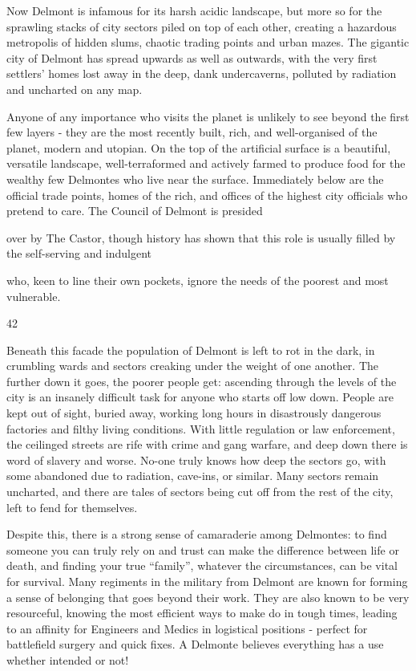 Now Delmont is infamous for its harsh acidic landscape, but more so for the sprawling stacks of city sectors piled on top of each other, creating a hazardous metropolis of hidden slums, chaotic trading points and urban mazes. The gigantic city of Delmont has spread upwards as well as outwards, with the very first settlers' homes lost away in the deep, dank undercaverns, polluted by radiation and uncharted on any map.

Anyone of any importance who visits the planet is unlikely to see beyond the first few layers - they are the most recently built, rich, and well-organised of the planet, modern and utopian. On the top of the artificial surface is a beautiful, versatile landscape, well-terraformed and actively farmed to produce food for the wealthy few Delmontes who live near the surface. Immediately below are the official trade points, homes of the rich, and offices of the highest city officials who pretend to care. The Council of Delmont is presided

over by The Castor, though history has shown that this role is usually filled by the self-serving and indulgent

who, keen to line their own pockets, ignore the needs of the poorest and most vulnerable.

42

Beneath this facade the population of Delmont is left to rot in the dark, in crumbling wards and sectors creaking under the weight of one another. The further down it goes, the poorer people get: ascending through the levels of the city is an insanely difficult task for anyone who starts off low down. People are kept out of sight, buried away, working long hours in disastrously dangerous factories and filthy living conditions. With little regulation or law enforcement, the ceilinged streets are rife with crime and gang warfare, and deep down there is word of slavery and worse. No-one truly knows how deep the sectors go, with some abandoned due to radiation, cave-ins, or similar. Many sectors remain uncharted, and there are tales of sectors being cut off from the rest of the city, left to fend for themselves.

Despite this, there is a strong sense of camaraderie among Delmontes: to find someone you can truly rely on and trust can make the difference between life or death, and finding your true ``family'', whatever the circumstances, can be vital for survival. Many regiments in the military from Delmont are known for forming a sense of belonging that goes beyond their work. They are also known to be very resourceful, knowing the most efficient ways to make do in tough times, leading to an affinity for Engineers and Medics in logistical positions - perfect for battlefield surgery and quick fixes. A Delmonte believes everything has a use whether intended or not!

